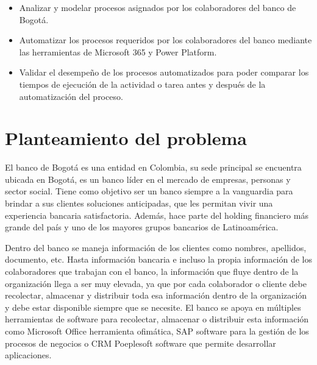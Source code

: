 \begin{itemize}
	\item Analizar y modelar procesos asignados por los colaboradores del banco de Bogotá.
	\item Automatizar los procesos requeridos por los colaboradores  del banco mediante las     herramientas de Microsoft 365 y Power Platform. 
	\item Validar el desempeño de los procesos automatizados para poder comparar los
	tiempos de ejecución de la actividad o tarea antes y después de la automatización del proceso.
\end{itemize} 



\section{Planteamiento del problema}
El banco de Bogotá es una entidad en Colombia, su sede principal se encuentra ubicada en Bogotá, es un banco líder en el mercado de empresas, personas y sector social. Tiene como objetivo ser un banco siempre a la vanguardia para brindar a sus clientes soluciones anticipadas, que les permitan vivir una experiencia bancaria satisfactoria. Además, hace parte del holding financiero más grande del país y uno de los mayores grupos bancarios de Latinoamérica.

Dentro del banco se maneja información de los clientes como nombres, apellidos, documento, etc. Hasta información bancaria e incluso la propia información de los colaboradores que trabajan con el banco, la información que fluye dentro de la organización llega a ser muy elevada, ya que por cada colaborador o cliente debe recolectar, almacenar y distribuir toda esa información dentro de la organización y debe estar disponible siempre que se necesite. El banco se apoya en múltiples herramientas de software para recolectar, almacenar o distribuir esta información como Microsoft Office herramienta ofimática, SAP software para la gestión de los procesos de negocios o CRM Poeplesoft software que permite desarrollar aplicaciones.

